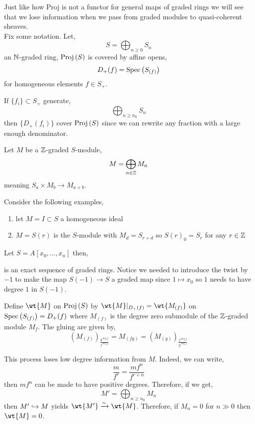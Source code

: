 \documentclass[12pt]{article}
\begin{document}
Just like how Proj is not a functor for general maps of graded rings we will see that we lose information when we pass from graded modules to quasi-coherent sheaves.
\bigskip\\
Fix some notation. Let,
\[ S = \bigoplus_{n \ge 0} S_n \]
an $\mathbb{N}$-graded ring, $\mathrm{Proj}\left( S \right)$ is covered by affine opens,
\[ D_+(f) = \mathrm{Spec}\left( S_{(f)} \right) \]
for homogeneous elements $f \in S_+$. 

\begin{rmk}
If $\{ f_i \} \subset S_+$ generate,
\[ \bigoplus_{n \ge n_0} S_n \]
then $\{ D_+(f_i) \}$ cover $\mathrm{Proj}\left( S \right)$ since we can rewrite any fraction with a large enough denominator. 
\end{rmk}

Let $M$ be a $\mathbb{Z}$-graded $S$-module,
\[ M = \bigoplus_{n \in \mathbb{Z}} M_n \]
meaning $S_a \times M_b \to M_{a+b}$. 

\begin{example}
Consider the following examples,
\begin{enumerate}
\item let $M = I \subset S$ a homogeneous ideal
\item $M = S(r)$ is the $S$-module with $M_d = S_{r+d}$ so $S(r)_0 = S_r$ for any $r \in \mathbb{Z}$
\end{enumerate}
\end{example}

\begin{example}
Let $S = A[x_0, \dots, x_n]$ then,
\begin{center}
\end{center}
is an exact sequence of graded rings. Notice we needed to introduce the twist by $-1$ to make the map $S(-1) \to S$ a graded map since $1 \mapsto x_0$ so $1$ needs to have degree $1$ in $S(-1)$. 
\end{example}

\begin{defn}
Define $\wt{M}$ on $\mathrm{Proj}\left( S \right)$ by $\wt{M}|_{D_+(f)} = \wt{M_{(f)}}$ on $\mathrm{Spec}\left( S_{(f)} \right) = D_+(f)$ where $M_{(f)}$ is the degree zero submodule of the $\mathbb{Z}$-graded module $M_f$. The gluing are given by,
\[ (M_{(f)})_{\frac{g^{\deg{f}}}{f^{\deg{f}}}} = M_{(fg)} = (M_{(g)})_{\frac{f^{\deg{g}}}{g^{\deg{f}}}} \]
\end{defn}

\begin{rmk}
This process loses low degree information from $M$. Indeed, we can write,
\[ \frac{m}{f^r} = \frac{m f^n}{f^{r + n}} \]
then $m f^n$ can be made to have positive degrees. Therefore, if we get,
\[ M' = \bigoplus_{n \ge n_0} M_n \]
then $M' \hookrightarrow M$ yields $\wt{M'} \iso \wt{M}$. Therefore, if $M_n = 0$ for $n \gg 0$ then $\wt{M} = 0$. 
\end{rmk}
\end{document}
